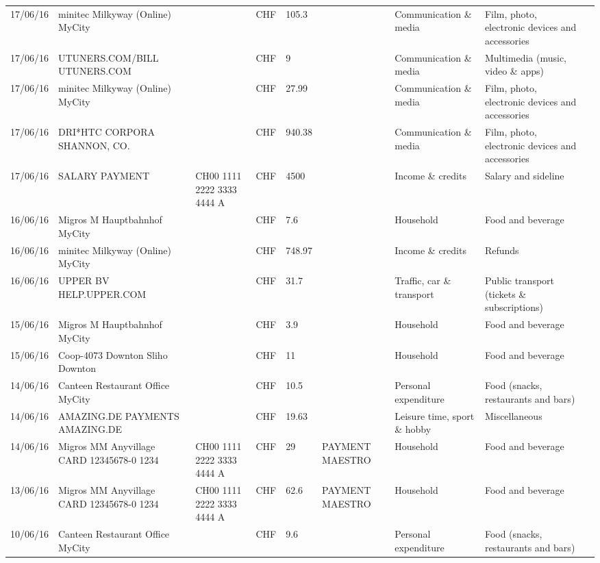 \begin{landscape}
\begin{tiny}
\begin{longtable}{lp{4cm}llllp{3cm}ll}
		    17/06/16 & minitec Milkyway (Online) MyCity &       & CHF   & 105.3 &       & Communication \& media & Film, photo, electronic devices and accessories \\
		    17/06/16 & UTUNERS.COM/BILL          UTUNERS.COM &       & CHF   & 9     &       & Communication \& media & Multimedia (music, video \& apps) \\
		    17/06/16 & minitec Milkyway (Online) MyCity &       & CHF   & 27.99 &       & Communication \& media & Film, photo, electronic devices and accessories \\
		    17/06/16 & DRI*HTC CORPORA          SHANNON, CO. &       & CHF   & 940.38 &       & Communication \& media & Film, photo, electronic devices and accessories \\
		    17/06/16 & SALARY PAYMENT & CH00 1111 2222 3333 4444 A & CHF   & 4500  &       & Income \& credits & Salary and sideline \\
		    16/06/16 & Migros M Hauptbahnhof    MyCity &       & CHF   & 7.6   &       & Household & Food and beverage \\
		    16/06/16 & minitec Milkyway (Online) MyCity &       & CHF   & 748.97 &       & Income \& credits & Refunds \\
		    16/06/16 & UPPER BV                  HELP.UPPER.COM &       & CHF   & 31.7  &       & Traffic, car \& transport & Public transport (tickets \& subscriptions) \\
		    15/06/16 & Migros M Hauptbahnhof    MyCity &       & CHF   & 3.9   &       & Household & Food and beverage \\
		    15/06/16 & Coop-4073 Downton Sliho   Downton &       & CHF   & 11    &       & Household & Food and beverage \\
		    14/06/16 & Canteen Restaurant Office      MyCity &       & CHF   & 10.5  &       & Personal expenditure & Food (snacks, restaurants and bars) \\
		    14/06/16 & AMAZING.DE PAYMENTS       AMAZING.DE &       & CHF   & 19.63 &       & Leisure time, sport \& hobby & Miscellaneous \\
		    14/06/16 & Migros MM Anyvillage CARD 12345678-0 1234 & CH00 1111 2222 3333 4444 A & CHF   & 29    & PAYMENT MAESTRO & Household & Food and beverage \\
		    13/06/16 & Migros MM Anyvillage CARD 12345678-0 1234 & CH00 1111 2222 3333 4444 A & CHF   & 62.6  & PAYMENT MAESTRO & Household & Food and beverage \\
		    10/06/16 & Canteen Restaurant Office      MyCity &       & CHF   & 9.6   &       & Personal expenditure & Food (snacks, restaurants and bars) \\

\end{longtable}
\end{tiny}
\end{landscape}
